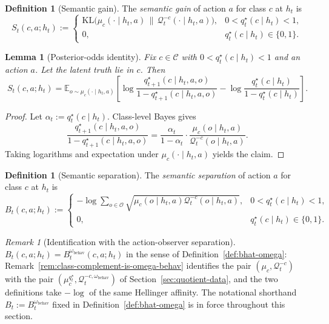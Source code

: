 \documentclass[11pt]{article}
\newtheorem{lemma}[theorem]{Lemma}
\theoremstyle{definition}
\newtheorem{definition}[theorem]{Definition}
\theoremstyle{remark}
\newtheorem{remark}[theorem]{Remark}
\newcommand{\Ccal}{\mathcal{C}}
\newcommand{\Ocal}{\mathcal{O}}
\newcommand{\Qcal}{\mathcal{Q}}
\newcommand{\E}{\mathbb{E}}
\newcommand{\KL}{\mathrm{KL}}
\begin{document}
\begin{definition}[Semantic gain]
\label{def:semantic-gain}
The \emph{semantic gain} of action $a$ for class $c$ at $h_t$ is
\[
S_t(c,a;h_t)
:=
\begin{cases}
\KL\!\bigl(\mu_c(\cdot\mid h_t,a)\,\|\,\Qcal_t^{-c}(\cdot\mid h_t,a)\bigr), & 0<q_t^\star(c\mid h_t)<1,\\
0, & q_t^\star(c\mid h_t)\in\{0,1\}.
\end{cases}
\]
\end{definition}

\begin{lemma}[Posterior-odds identity]
\label{lem:odds-identity}
Fix $c\in\Ccal$ with $0<q_t^\star(c\mid h_t)<1$ and an action $a$. Let the latent truth lie in $c$. Then
\[
S_t(c,a;h_t)
=
\E_{o\sim\mu_c(\cdot\mid h_t,a)}\!\left[
\log\frac{q_{t+1}^\star(c\mid h_t,a,o)}{1-q_{t+1}^\star(c\mid h_t,a,o)}
-\log\frac{q_t^\star(c\mid h_t)}{1-q_t^\star(c\mid h_t)}
\right].
\]
\end{lemma}

\begin{proof}
Let $\alpha_t:=q_t^\star(c\mid h_t)$. Class-level Bayes gives
\[
\frac{q_{t+1}^\star(c\mid h_t,a,o)}{1-q_{t+1}^\star(c\mid h_t,a,o)}
=
\frac{\alpha_t}{1-\alpha_t}\cdot\frac{\mu_c(o\mid h_t,a)}{\Qcal_t^{-c}(o\mid h_t,a)}.
\]
Taking logarithms and expectation under $\mu_c(\cdot\mid h_t,a)$ yields the claim.
\end{proof}

\begin{definition}[Semantic separation]
\label{def:semantic-separation}
The \emph{semantic separation} of action $a$ for class $c$ at $h_t$ is
\[
B_t(c,a;h_t)
:=
\begin{cases}
-\log\sum_{o\in\Ocal}\sqrt{\mu_c(o\mid h_t,a)\Qcal_t^{-c}(o\mid h_t,a)}, & 0<q_t^\star(c\mid h_t)<1,\\
0, & q_t^\star(c\mid h_t)\in\{0,1\}.
\end{cases}
\]
\end{definition}

\begin{remark}[Identification with the action-observer separation]
\label{rem:B-is-B-omega-behav}
$B_t(c,a;h_t)=B_t^{\omega_{\mathrm{behav}}}(c,a;h_t)$ in the sense of Definition~\ref{def:bhat-omega}: Remark~\ref{rem:class-complement-is-omega-behav} identifies the pair $(\mu_c,\Qcal_t^{-c})$ with the pair $(\mu_c^{q_t^\star},\Qcal_t^{-c,\omega_{\mathrm{behav}}})$ of Section~\ref{sec:quotient-data}, and the two definitions take $-\log$ of the same Hellinger affinity. The notational shorthand $B_t:=B_t^{\omega_{\mathrm{behav}}}$ fixed in Definition~\ref{def:bhat-omega} is in force throughout this section.
\end{remark}
\end{document}

